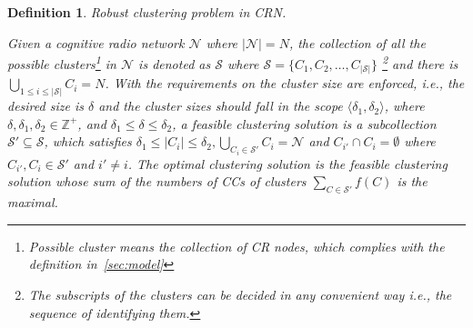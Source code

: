 \documentclass[10pt,journal,compsoc]{IEEEtran}
\theoremstyle{mytheoremstyle}
\theoremstyle{mytheoremstyle}
\theoremstyle{mytheoremstyle}
\newtheorem{mydef}{Definition}%
\newcommand{\ie}{i.e., }
\begin{document}
\begin{mydef}
\label{def_centralized_clustering}
\textit{Robust clustering problem in CRN.}

Given a cognitive radio network $\mathcal{N}$ where $|\mathcal{N}|=N$, the collection of all the possible clusters\footnote{Possible cluster means the collection of CR nodes, which complies with the definition in~\ref{sec:model}} in $\mathcal{N}$ is denoted as $\mathcal{S}$ where $\mathcal{S}=\{C_1, C_2,\ldots,C_{|\mathcal{S}|}\}$ \footnote{The subscripts of the clusters can be decided in any convenient way \ie the sequence of identifying them.} and there is $\bigcup_{1\leq i \leq |\mathcal{S}|} C_i = N$.
%
With the requirements on the cluster size are enforced, \ie the desired size is $\delta$ and the cluster sizes should fall in the scope $\langle\delta_1, \delta_2\rangle$, where $\delta, \delta_1, \delta_2\in \mathbb{Z}^+$, and $\delta_1 \leq \delta\leq \delta_2$, a feasible clustering solution is a subcollection $\mathcal{S}' \subseteq \mathcal{S}$, which satisfies 
$\delta_1\leq|C_i|\leq \delta_2, \bigcup_{C_i\in \mathcal{S}'} C_i = \mathcal{N}$ and $C_{i'}\cap C_i =\emptyset$ where $C_{i'}, C_i\in \mathcal{S}'$ and $i'\neq i$.
The optimal clustering solution is the feasible clustering solution whose sum of the numbers of CCs of clusters $\sum_{C\in \mathcal{S}'} f(C)$ is the maximal.


\end{mydef}


\end{document}
